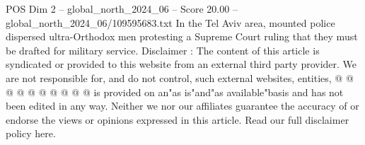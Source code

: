 \begin{textsample}{POS Dim 2 – global\_north\_2024\_06 – Score 20.00 – global\_north\_2024\_06/109595683.txt}
In the Tel Aviv area, mounted police dispersed ultra-Orthodox men protesting a Supreme Court ruling that they must be drafted for military service.
Disclaimer : The content of this article is syndicated or provided to this website from an external third party provider.
We are not responsible for, and do not control, such external websites, entities, @ @ @ @ @ @ @ @ @ @ is provided on an"as is"and"as available"basis and has not been edited in any way.
Neither we nor our affiliates guarantee the accuracy of or endorse the views or opinions expressed in this article.
Read our full disclaimer policy here.

\end{textsample}
